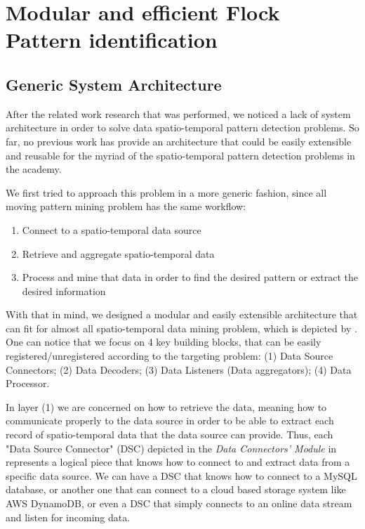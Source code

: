\chapter{Modular and efficient Flock Pattern identification}
\label{chp:solution}
\section{Generic System Architecture}
\label{sec:architecture}
After the related work research that was performed, we noticed a lack of system architecture in order to solve data
spatio-temporal pattern detection problems. So far, no previous work has provide an architecture that could be easily
extensible and reusable for the myriad of the spatio-temporal pattern detection problems in the academy.

We first tried to approach this problem in a more generic fashion, since all moving pattern mining problem has the same
workflow:

\begin{enumerate}
    \item Connect to a spatio-temporal data source
    \item Retrieve and aggregate spatio-temporal data
    \item Process and mine that data in order to find the desired pattern or extract the desired information
\end{enumerate}

With that in mind, we designed a modular and easily extensible architecture that can fit for almost all spatio-temporal
data mining problem, which is depicted by . One can notice that we focus on 4 key building
blocks, that can be easily registered/unregistered according to the targeting problem: (1) Data Source Connectors; (2)
Data Decoders; (3) Data Listeners (Data aggregators); (4) Data Processor.

In layer (1) we are concerned on how to retrieve the data, meaning how to communicate properly to the data source in
order to be able to extract each record of spatio-temporal data that the data source can provide. Thus, each "Data
Source Connector" (DSC) depicted in the \textit{Data Connectors' Module} in  represents a
logical piece that knows how to connect to and extract data from a specific data source. We can have a DSC that knows
how to connect to a MySQL database, or another one that can connect to a cloud based storage system like AWS DynamoDB,
or even a DSC that simply connects to an online data stream and listen for incoming data.


